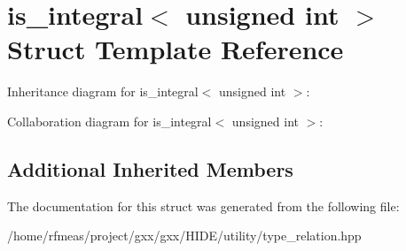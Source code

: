 \hypertarget{structis__integral_3_01unsigned_01int_01_4}{}\section{is\+\_\+integral$<$ unsigned int $>$ Struct Template Reference}
\label{structis__integral_3_01unsigned_01int_01_4}


Inheritance diagram for is\+\_\+integral$<$ unsigned int $>$\+:


Collaboration diagram for is\+\_\+integral$<$ unsigned int $>$\+:
\subsection*{Additional Inherited Members}


The documentation for this struct was generated from the following file\+:\begin{DoxyCompactItemize}
\item 
/home/rfmeas/project/gxx/gxx/\+H\+I\+D\+E/utility/type\+\_\+relation.\+hpp\end{DoxyCompactItemize}
